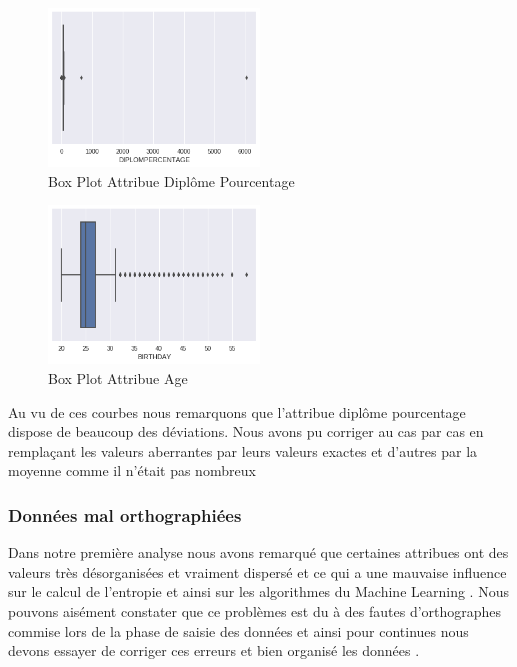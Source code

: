 \begin{figure}[ht]
	\centering
	\includegraphics[width=0.5\textwidth]{fig/AGEPlot1.png}
	\caption{Box Plot Attribue Diplôme Pourcentage  }
	\label{fig:AgeBXPlot1}
\end{figure} 

\begin{figure}[ht]
	\centering
	\includegraphics[width=0.5\textwidth]{fig/PercetagePlot.png}
	\caption{Box Plot Attribue  Age  }
	\label{fig:PercBXPlot1}
\end{figure} 
Au vu de ces courbes nous remarquons que l'attribue diplôme pourcentage
dispose de beaucoup des déviations. Nous avons pu corriger au cas par cas en remplaçant les valeurs aberrantes par leurs valeurs exactes et d'autres par la moyenne comme il n'était pas nombreux
\subsubsection{Données mal orthographiées }
Dans notre première analyse nous avons remarqué que certaines  attribues ont des valeurs très désorganisées et vraiment dispersé et ce
qui a une mauvaise influence sur le calcul de l'entropie et ainsi sur
les algorithmes du Machine Learning . Nous pouvons aisément constater
que ce problèmes est du à des fautes d'orthographes commise lors de la
phase de saisie des données et ainsi pour continues nous devons essayer
de corriger ces erreurs et bien organisé les données . 

